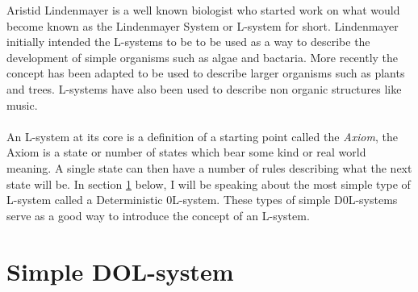 Aristid Lindenmayer is a well known biologist who started work on what would become known as the Lindenmayer System or L-system for short. Lindenmayer initially intended the L-systems to be to be used as a way to describe the development of simple organisms such as algae and bactaria. More recently the concept has been adapted to be used to describe larger organisms such as plants and trees. L-systems have also been used to describe non organic structures like music. \cite{worth2005growing} \\
\\
An L-system at its core is a definition of a starting point called the \textit{Axiom}, the Axiom is a state or number of states which bear some kind or real world meaning. A single state can then have a number of rules describing what the next state will be. In section \ref{Simple DOL-systems} below, I will be speaking about the most simple type of L-system called a Deterministic 0L-system. These types of simple D0L-systems serve as a good way to introduce the concept of an L-system.


\section{Simple DOL-system} \label{Simple DOL-systems}


